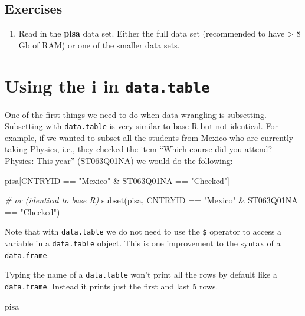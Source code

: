 \documentclass[
]{book}
\newenvironment{Shaded}{\begin{snugshade}}{\end{snugshade}}
\newcommand{\CommentTok}[1]{\textcolor[rgb]{0.56,0.35,0.01}{\textit{#1}}}
\newcommand{\FunctionTok}[1]{\textcolor[rgb]{0.00,0.00,0.00}{#1}}
\newcommand{\NormalTok}[1]{#1}
\newcommand{\SpecialCharTok}[1]{\textcolor[rgb]{0.00,0.00,0.00}{#1}}
\newcommand{\StringTok}[1]{\textcolor[rgb]{0.31,0.60,0.02}{#1}}
\providecommand{\tightlist}{%
  \setlength{\itemsep}{0pt}\setlength{\parskip}{0pt}}
\begin{document}
\hypertarget{exercises}{%
\subsection{Exercises}\label{exercises}}

\begin{enumerate}
\def\labelenumi{\arabic{enumi}.}
\tightlist
\item
  Read in the \textbf{pisa} data set. Either the full data set (recommended to have \textgreater{} 8 Gb of RAM) or one of the smaller data sets.
\end{enumerate}

\hypertarget{using-the-i-in-data.table}{%
\section{\texorpdfstring{Using the i in \texttt{data.table}}{Using the i in data.table}}\label{using-the-i-in-data.table}}

One of the first things we need to do when data wrangling is subsetting. Subsetting with \texttt{data.table} is very similar to base R but not identical. For example, if we wanted to subset all the students from Mexico who are currently taking Physics, i.e., they checked the item ``Which course did you attend? Physics: This year'' (ST063Q01NA) we would do the following:

\begin{Shaded}
\begin{Highlighting}[]
\NormalTok{pisa[CNTRYID }\SpecialCharTok{==} \StringTok{"Mexico"} \SpecialCharTok{\&}\NormalTok{ ST063Q01NA }\SpecialCharTok{==} \StringTok{"Checked"}\NormalTok{]}

\CommentTok{\# or (identical to base R)}
\FunctionTok{subset}\NormalTok{(pisa, CNTRYID }\SpecialCharTok{==} \StringTok{"Mexico"} \SpecialCharTok{\&}\NormalTok{ ST063Q01NA }\SpecialCharTok{==} \StringTok{"Checked"}\NormalTok{)}
\end{Highlighting}
\end{Shaded}

Note that with \texttt{data.table} we do not need to use the \texttt{\$} operator to access a variable in a \texttt{data.table} object. This is one improvement to the syntax of a \texttt{data.frame}.

Typing the name of a \texttt{data.table} won't print all the rows by default like a \texttt{data.frame}. Instead it prints just the first and last 5 rows.

\begin{Shaded}
\begin{Highlighting}[]
\NormalTok{pisa}
\end{Highlighting}
\end{Shaded}
\end{document}
